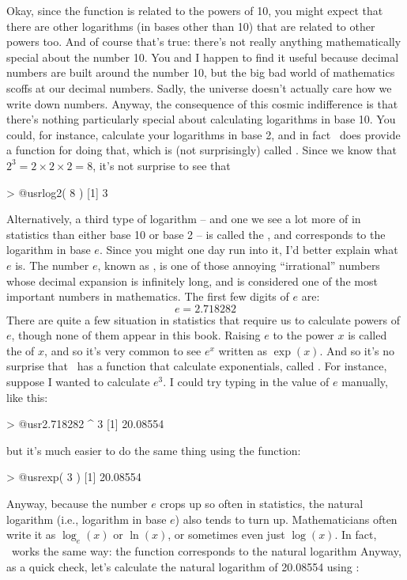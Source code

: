 Okay, since the  function is related to the powers of 10, you might expect that there are other logarithms (in bases other than 10) that are related to other powers too. And of course that's true: there's not really anything mathematically special about the number 10. You and I happen to find it useful because decimal numbers are built around the number 10, but the big bad world of mathematics scoffs at our decimal numbers. Sadly, the universe doesn't actually care how we write down numbers. Anyway, the consequence of this cosmic indifference is that there's nothing particularly special about calculating logarithms in base 10. You could, for instance, calculate your logarithms in base 2, and in fact \R\ does provide a function for doing that, which is (not surprisingly) called . Since we know that $2^3 = 2 \times 2 \times 2 = 8$, it's not surprise to see that 
\begin{rblock1}
> @usr{log2( 8 )}
[1] 3
\end{rblock1}
Alternatively, a third type of logarithm -- and one we see a lot more of in statistics than either base 10 or base 2 -- is called the , and corresponds to the logarithm in base $e$. Since you might one day run into it, I'd better explain what $e$ is. The number $e$, known as , is one of those annoying ``irrational'' numbers whose decimal expansion is infinitely long, and is considered one of the most important numbers in mathematics. The first few digits of $e$ are:
$$
e = 2.718282 
$$ 
There are quite a few situation in statistics that require us to calculate powers of $e$, though none of them appear in this book. Raising $e$ to the power $x$ is called the  of $x$, and so it's very common to see $e^x$ written as $\exp(x)$. And so it's no surprise that \R\ has a function that calculate exponentials, called . For instance, suppose I wanted to calculate $e^3$. I could try typing in the value of $e$ manually, like this:
\begin{rblock1}
> @usr{2.718282 ^ 3}
[1] 20.08554
\end{rblock1}
but it's much easier to do the same thing using the  function:
\begin{rblock1}
> @usr{exp( 3 )}
[1] 20.08554
\end{rblock1}
Anyway, because the number $e$ crops up so often in statistics, the natural logarithm (i.e., logarithm in base $e$) also tends to turn up. Mathematicians often write it as $\log_e(x)$ or $\ln(x)$, or sometimes even just $\log(x)$. In fact, \R\ works the same way: the  function corresponds to the natural logarithm Anyway, as a quick check, let's calculate the natural logarithm of 20.08554 using \R:
